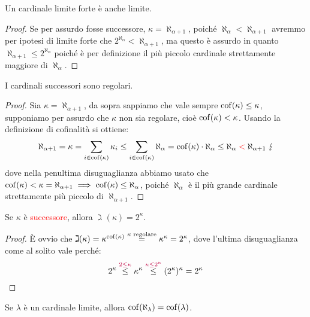 \begin{proposition}
	Un cardinale limite forte è anche limite.
\end{proposition}

\begin{proof}
	Se per assurdo fosse successore, $\kappa = \aleph_{\alpha + 1}$, poiché $\aleph_\alpha < \aleph_{\alpha + 1}$ avremmo per ipotesi di limite forte che $2^{\aleph_\alpha} < \aleph_{\alpha + 1}$, ma questo è assurdo in quanto $\aleph_{\alpha + 1} \leq 2^{\aleph_\alpha}$ poiché è per definizione il più piccolo cardinale strettamente maggiore di $\aleph_{\alpha}$.
\end{proof}

\begin{proposition}
	I cardinali successori sono regolari.
\end{proposition}

\begin{proof}
	Sia $\kappa = \aleph_{\alpha + 1}$, da sopra sappiamo che vale sempre $\operatorname{cof}(\kappa) \leq \kappa$, supponiamo per assurdo che $\kappa$ non sia regolare, cioè $\operatorname{cof}(\kappa) < \kappa$. Usando la definizione di cofinalità si ottiene:
	\[ \aleph_{\alpha + 1} = \kappa = \sum_{i \in \operatorname{cof}(\kappa)} \kappa_i \leq \sum_{i \in \operatorname{cof}(\kappa)} \aleph_\alpha = \operatorname{cof}(\kappa) \cdot \aleph_\alpha \leq \aleph_\alpha \;\textcolor{red}{<}\; \aleph_{\alpha + 1} \; \lightning
		\]
	dove nella penultima disuguaglianza abbiamo usato che $\operatorname{cof}(\kappa) < \kappa = \aleph_{\alpha + 1} \implies \operatorname{cof}(\kappa) \leq \aleph_\alpha$, poiché $\aleph_\alpha$ è il più grande cardinale strettamente più piccolo di $\aleph_{\alpha + 1}$.
\end{proof}

\begin{corollary}
	Se $\kappa$ è \textcolor{red}{successore}, allora $\gimel(\kappa) = 2^{\kappa}$.
\end{corollary}

\begin{proof}
	È ovvio che $\gimel(\kappa) = \kappa^{\operatorname{cof}(\kappa)} \overset{\text{$\kappa$ regolare}}{=} \kappa^\kappa = 2^{\kappa}$, dove l'ultima disuguaglianza come al solito vale perché:
	\[ 2^{\kappa} \overset{\textcolor{purple}{2 \leq \kappa}}{\leq} \kappa^{\kappa} \overset{\textcolor{purple}{\kappa \leq 2^\kappa}}{\leq} (2^{\kappa})^{\kappa} = 2^{\kappa}
		\]
\end{proof}

\begin{proposition}
	Se $\lambda$ è un cardinale limite, allora $\operatorname{cof}(\aleph_\lambda) = \operatorname{cof}(\lambda)$.
\end{proposition}

